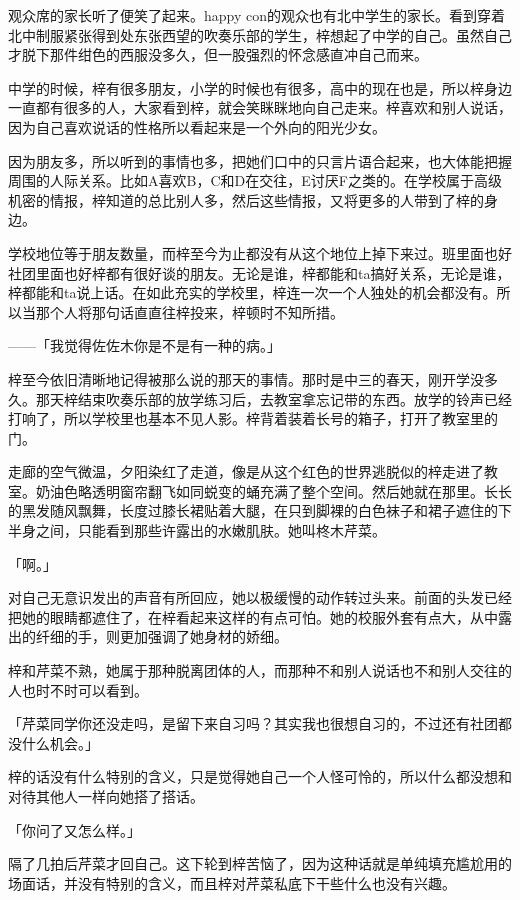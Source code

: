 \documentclass[UTF8]{ctexart}
\begin{document}
    观众席的家长听了便笑了起来。happy con的观众也有北中学生的家长。看到穿着北中制服紧张得到处东张西望的吹奏乐部的学生，梓想起了中学的自己。虽然自己才脱下那件绀色的西服没多久，但一股强烈的怀念感直冲自己而来。

    中学的时候，梓有很多朋友，小学的时候也有很多，高中的现在也是，所以梓身边一直都有很多的人，大家看到梓，就会笑眯眯地向自己走来。梓喜欢和别人说话，因为自己喜欢说话的性格所以看起来是一个外向的阳光少女。

    因为朋友多，所以听到的事情也多，把她们口中的只言片语合起来，也大体能把握周围的人际关系。比如A喜欢B，C和D在交往，E讨厌F之类的。在学校属于高级机密的情报，梓知道的总比别人多，然后这些情报，又将更多的人带到了梓的身边。

    学校地位等于朋友数量，而梓至今为止都没有从这个地位上掉下来过。班里面也好社团里面也好梓都有很好谈的朋友。无论是谁，梓都能和ta搞好关系，无论是谁，梓都能和ta说上话。在如此充实的学校里，梓连一次一个人独处的机会都没有。所以当那个人将那句话直直往梓投来，梓顿时不知所措。

    ——「我觉得佐佐木你是不是有一种的病。」

    梓至今依旧清晰地记得被那么说的那天的事情。那时是中三的春天，刚开学没多久。那天梓结束吹奏乐部的放学练习后，去教室拿忘记带的东西。放学的铃声已经打响了，所以学校里也基本不见人影。梓背着装着长号的箱子，打开了教室里的门。

    走廊的空气微温，夕阳染红了走道，像是从这个红色的世界逃脱似的梓走进了教室。奶油色略透明窗帘翻飞如同蜕变的蛹充满了整个空间。然后她就在那里。长长的黑发随风飘舞，长度过膝长裙贴着大腿，在只到脚裸的白色袜子和裙子遮住的下半身之间，只能看到那些许露出的水嫩肌肤。她叫柊木芹菜。

    「啊。」

    对自己无意识发出的声音有所回应，她以极缓慢的动作转过头来。前面的头发已经把她的眼睛都遮住了，在梓看起来这样的有点可怕。她的校服外套有点大，从中露出的纤细的手，则更加强调了她身材的娇细。

    梓和芹菜不熟，她属于那种脱离团体的人，而那种不和别人说话也不和别人交往的人也时不时可以看到。

    「芹菜同学你还没走吗，是留下来自习吗？其实我也很想自习的，不过还有社团都没什么机会。」

    梓的话没有什么特别的含义，只是觉得她自己一个人怪可怜的，所以什么都没想和对待其他人一样向她搭了搭话。

    「你问了又怎么样。」

    隔了几拍后芹菜才回自己。这下轮到梓苦恼了，因为这种话就是单纯填充尴尬用的场面话，并没有特别的含义，而且梓对芹菜私底下干些什么也没有兴趣。
\end{document}
